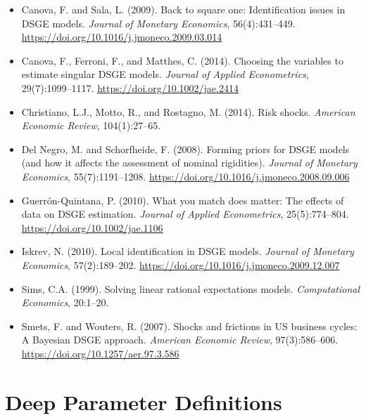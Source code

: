 \documentclass[12pt]{article}
\begin{document}
\begin{itemize}
    \item Canova, F. and Sala, L. (2009). Back to square one: Identification issues in DSGE models. \textit{Journal of Monetary Economics}, 56(4):431--449. \url{https://doi.org/10.1016/j.jmoneco.2009.03.014}

    \item Canova, F., Ferroni, F., and Matthes, C. (2014). Choosing the variables to estimate singular DSGE models. \textit{Journal of Applied Econometrics}, 29(7):1099--1117. \url{https://doi.org/10.1002/jae.2414}

    \item Christiano, L.J., Motto, R., and Rostagno, M. (2014). Risk shocks. \textit{American Economic Review}, 104(1):27--65.

    \item Del Negro, M. and Schorfheide, F. (2008). Forming priors for DSGE models (and how it affects the assessment of nominal rigidities). \textit{Journal of Monetary Economics}, 55(7):1191--1208. \url{https://doi.org/10.1016/j.jmoneco.2008.09.006}

    \item Guerr\'{o}n-Quintana, P. (2010). What you match does matter: The effects of data on DSGE estimation. \textit{Journal of Applied Econometrics}, 25(5):774--804. \url{https://doi.org/10.1002/jae.1106}

    \item Iskrev, N. (2010). Local identification in DSGE models. \textit{Journal of Monetary Economics}, 57(2):189--202. \url{https://doi.org/10.1016/j.jmoneco.2009.12.007}

    \item Sims, C.A. (1999). Solving linear rational expectations models. \textit{Computational Economics}, 20:1--20.

    \item Smets, F. and Wouters, R. (2007). Shocks and frictions in US business cycles: A Bayesian DSGE approach. \textit{American Economic Review}, 97(3):586--606. \url{https://doi.org/10.1257/aer.97.3.586}
\end{itemize}

\newpage
\appendix
\section{Deep Parameter Definitions}
\end{document}
